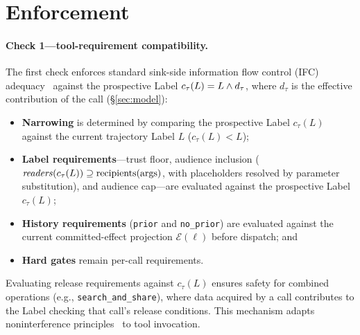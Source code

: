 \section{Enforcement}\label{sec:enforcement}

\paragraph{Check 1---tool-requirement compatibility.}
The first check enforces standard sink-side information flow control (IFC) adequacy~\cite{sabelfeld2003language} against the prospective Label $c_\tau(L) = L \wedge d_\tau$, where $d_\tau$ is the effective contribution of the call (\S\ref{sec:model}):
\begin{itemize}
  \item \textbf{Narrowing} is determined by comparing the prospective Label $c_\tau(L)$ against the current trajectory Label $L$ ($c_\tau(L) < L$);
  \item \textbf{Label requirements}---trust floor, audience inclusion ($\mathit{readers}(c_\tau(L)) \supseteq \mathrm{recipients}(\mathrm{args})$, with placeholders resolved by parameter substitution), and audience cap---are evaluated against the prospective Label $c_\tau(L)$;
  \item \textbf{History requirements} (\texttt{prior} and \texttt{no\_prior}) are evaluated against the current committed-effect projection $\mathcal{E}(\ell)$ before dispatch; and
  \item \textbf{Hard gates} remain per-call requirements.
\end{itemize}
Evaluating release requirements against $c_\tau(L)$ ensures safety for combined operations (e.g., \texttt{search\_and\_share}), where data acquired by a call contributes to the Label checking that call's release conditions. This mechanism adapts noninterference principles~\cite{goguen1982security} to tool invocation.

